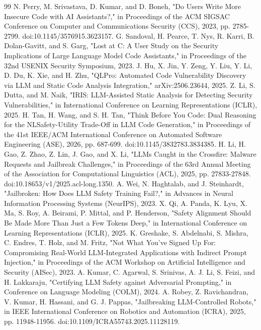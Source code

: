 \documentclass{ieeeaccess}
\begin{document}
\begin{thebibliography}{99}
 N. Perry, M. Srivastava, D. Kumar, and D. Boneh, "Do Users Write More Insecure Code with AI Assistants?," in Proceedings of the ACM SIGSAC Conference on Computer and Communications Security (CCS), 2023, pp. 2785-2799. doi:10.1145/3576915.3623157.
 G. Sandoval, H. Pearce, T. Nys, R. Karri, B. Dolan-Gavitt, and S. Garg, "Lost at C: A User Study on the Security Implications of Large Language Model Code Assistants," in Proceedings of the 32nd USENIX Security Symposium, 2023.
 J. Hu, X. Jin, Y. Zeng, Y. Liu, Y. Li, D. Du, K. Xie, and H. Zhu, "QLPro: Automated Code Vulnerability Discovery via LLM and Static Code Analysis Integration," arXiv:2506.23644, 2025.
 Z. Li, S. Dutta, and M. Naik, "IRIS: LLM-Assisted Static Analysis for Detecting Security Vulnerabilities," in International Conference on Learning Representations (ICLR), 2025.
 H. Tan, H. Wang, and S. H. Tan, "Think Before You Code: Dual Reasoning for the NLSafety-Utility Trade-Off in LLM Code Generation," in Proceedings of the 41st IEEE/ACM International Conference on Automated Software Engineering (ASE), 2026, pp. 687-699. doi:10.1145/3832783.3834385.
 H. Li, H. Gao, Z. Zhao, Z. Lin, J. Gao, and X. Li, "LLMs Caught in the Crossfire: Malware Requests and Jailbreak Challenges," in Proceedings of the 63rd Annual Meeting of the Association for Computational Linguistics (ACL), 2025, pp. 27833-27848. doi:10.18653/v1/2025.acl-long.1350.
 A. Wei, N. Haghtalab, and J. Steinhardt, "Jailbroken: How Does LLM Safety Training Fail?," in Advances in Neural Information Processing Systems (NeurIPS), 2023.
 X. Qi, A. Panda, K. Lyu, X. Ma, S. Roy, A. Beirami, P. Mittal, and P. Henderson, "Safety Alignment Should Be Made More Than Just a Few Tokens Deep," in International Conference on Learning Representations (ICLR), 2025.
 K. Greshake, S. Abdelnabi, S. Mishra, C. Endres, T. Holz, and M. Fritz, "Not What You've Signed Up For: Compromising Real-World LLM-Integrated Applications with Indirect Prompt Injection," in Proceedings of the ACM Workshop on Artificial Intelligence and Security (AISec), 2023.
 A. Kumar, C. Agarwal, S. Srinivas, A. J. Li, S. Feizi, and H. Lakkaraju, "Certifying LLM Safety against Adversarial Prompting," in Conference on Language Modeling (COLM), 2024.
 A. Robey, Z. Ravichandran, V. Kumar, H. Hassani, and G. J. Pappas, "Jailbreaking LLM-Controlled Robots," in IEEE International Conference on Robotics and Automation (ICRA), 2025, pp. 11948-11956. doi:10.1109/ICRA55743.2025.11128119.

\end{thebibliography}
\end{document}
